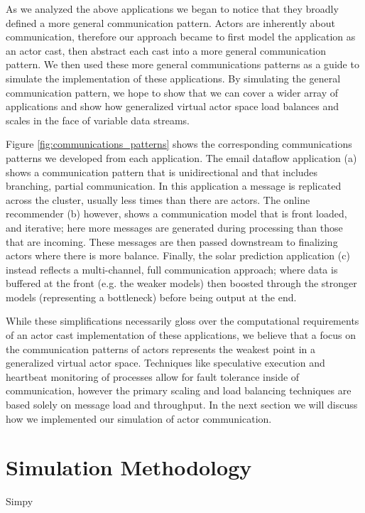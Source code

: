 \documentclass[conference,twocolumn,10pt]{IEEEtran}
\begin{document}
As we analyzed the above applications we began to notice that they broadly defined a more general communication pattern. Actors are inherently about communication, therefore our approach became to first model the application as an actor cast, then abstract each cast into a more general communication pattern. We then used these more general communications patterns as a guide to simulate the implementation of these applications. By simulating the general communication pattern, we hope to show that we can cover a wider array of applications and show how generalized virtual actor space load balances and scales in the face of variable data streams.

Figure \ref{fig:communications_patterns} shows the corresponding communications patterns we developed from each application. The email dataflow application (a) shows a communication pattern that is unidirectional and that includes branching, partial communication. In this application a message is replicated across the cluster, usually less times than there are actors. The online recommender (b) however, shows a communication model that is front loaded, and iterative; here more messages are generated during processing than those that are incoming. These messages are then passed downstream to finalizing actors where there is more balance. Finally, the solar prediction application (c) instead reflects a multi-channel, full communication approach; where data is buffered at the front (e.g. the weaker models) then boosted through the stronger models (representing a bottleneck) before being output at the end.

While these simplifications necessarily gloss over the computational requirements of an actor cast implementation of these applications, we believe that a focus on the communication patterns of actors represents the weakest point in a generalized virtual actor space. Techniques like speculative execution and heartbeat monitoring of processes allow for fault tolerance inside of communication, however the primary scaling and load balancing techniques are based solely on message load and throughput. In the next section we will discuss how we implemented our simulation of actor communication.

\section{Simulation Methodology}

Simpy \cite{matloff_introduction_2008}
\end{document}
